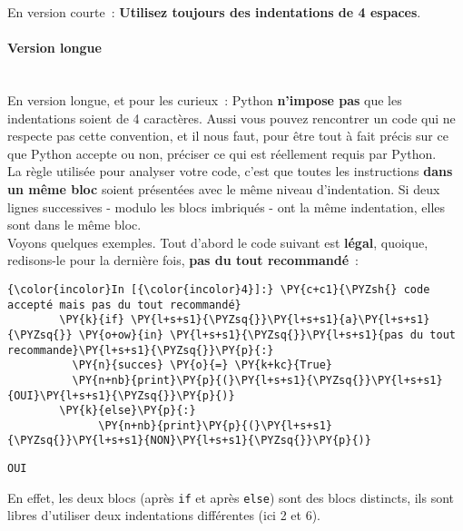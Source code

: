     En version courte~: \textbf{Utilisez toujours des indentations de 4
espaces}.

    \hypertarget{version-longue}{%
\paragraph{Version longue\\\\}\label{version-longue}}

    En version longue, et pour les curieux~: Python \textbf{n'impose pas}
que les indentations soient de 4 caractères. Aussi vous pouvez
rencontrer un code qui ne respecte pas cette convention, et il nous
faut, pour être tout à fait précis sur ce que Python accepte ou non,
préciser ce qui est réellement requis par Python.\\

    La règle utilisée pour analyser votre code, c'est que toutes les
instructions \textbf{dans un même bloc} soient présentées avec le même
niveau d'indentation. Si deux lignes successives - modulo les blocs
imbriqués - ont la même indentation, elles sont dans le même bloc.\\

Voyons quelques exemples. Tout d'abord le code suivant est
\textbf{légal}, quoique, redisons-le pour la dernière fois, \textbf{pas
du tout recommandé}~:

    \begin{Verbatim}[commandchars=\\\{\}]
{\color{incolor}In [{\color{incolor}4}]:} \PY{c+c1}{\PYZsh{} code accepté mais pas du tout recommandé}
        \PY{k}{if} \PY{l+s+s1}{\PYZsq{}}\PY{l+s+s1}{a}\PY{l+s+s1}{\PYZsq{}} \PY{o+ow}{in} \PY{l+s+s1}{\PYZsq{}}\PY{l+s+s1}{pas du tout recommande}\PY{l+s+s1}{\PYZsq{}}\PY{p}{:}
          \PY{n}{succes} \PY{o}{=} \PY{k+kc}{True}
          \PY{n+nb}{print}\PY{p}{(}\PY{l+s+s1}{\PYZsq{}}\PY{l+s+s1}{OUI}\PY{l+s+s1}{\PYZsq{}}\PY{p}{)}
        \PY{k}{else}\PY{p}{:}
              \PY{n+nb}{print}\PY{p}{(}\PY{l+s+s1}{\PYZsq{}}\PY{l+s+s1}{NON}\PY{l+s+s1}{\PYZsq{}}\PY{p}{)}
\end{Verbatim}


    \begin{Verbatim}[commandchars=\\\{\}]
OUI

    \end{Verbatim}

    En effet, les deux blocs (après \texttt{if} et après \texttt{else}) sont
des blocs distincts, ils sont libres d'utiliser deux indentations
différentes (ici 2 et 6).\\

